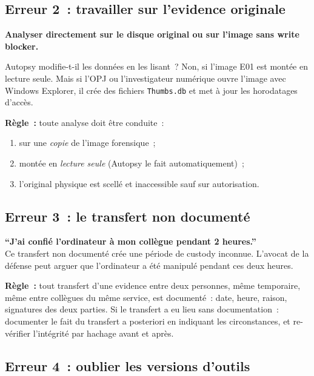 \subsection{Erreur 2~: travailler sur l'evidence originale}

\begin{boxalert}
\textbf{Analyser directement sur le disque original ou sur l'image sans
write blocker.}

Autopsy modifie-t-il les données en les lisant~? Non, si l'image E01 est
montée en lecture seule. Mais si l'OPJ ou l'investigateur numérique ouvre l'image avec Windows Explorer,
il crée des fichiers \texttt{Thumbs.db} et met à jour les horodatages d'accès.

\textbf{Règle~:} toute analyse doit être conduite~:
\begin{enumerate}
    \item sur une \emph{copie} de l'image forensique~;
    \item montée en \emph{lecture seule} (Autopsy le fait automatiquement)~;
    \item l'original physique est scellé et inaccessible sauf sur autorisation.
\end{enumerate}
\end{boxalert}

\subsection{Erreur 3~: le transfert non documenté}

\begin{boxalert}
\textbf{``J'ai confié l'ordinateur à mon collègue pendant 2 heures.''}\\
Ce transfert non documenté crée une période de custody inconnue.
L'avocat de la défense peut arguer que l'ordinateur a été manipulé
pendant ces deux heures.

\textbf{Règle~:} tout transfert d'une evidence entre deux personnes, même
temporaire, même entre collègues du même service, est documenté~: date,
heure, raison, signatures des deux parties. Si le transfert a eu lieu sans
documentation~: documenter le fait du transfert a posteriori en indiquant
les circonstances, et re-vérifier l'intégrité par hachage avant et après.
\end{boxalert}

\subsection{Erreur 4~: oublier les versions d'outils}


